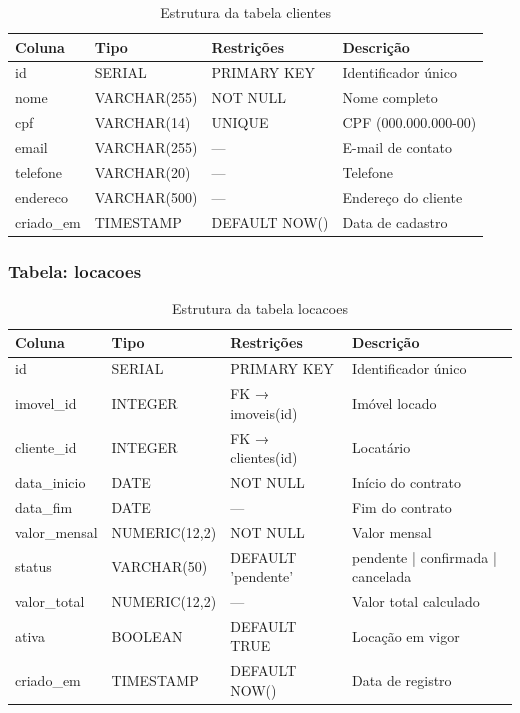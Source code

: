 \documentclass[12pt, a4paper]{article}
\newcommand{\thead}[1]{\cellcolor{tableheader}\color{white}\bfseries #1}
\newcommand{\talt}{\rowcolor{tablerowalt}}
\begin{document}
\begin{table}[H]
\centering
\begin{tabularx}{\textwidth}{|l|l|l|X|}
\hline
\thead{Coluna} & \thead{Tipo} & \thead{Restrições} & \thead{Descrição} \\
\hline
id         & SERIAL       & PRIMARY KEY   & Identificador único \\
\talt nome      & VARCHAR(255) & NOT NULL      & Nome completo \\
cpf        & VARCHAR(14)  & UNIQUE        & CPF (000.000.000-00) \\
\talt email     & VARCHAR(255) & —             & E-mail de contato \\
telefone   & VARCHAR(20)  & —             & Telefone \\
\talt endereco  & VARCHAR(500) & —             & Endereço do cliente \\
criado\_em & TIMESTAMP    & DEFAULT NOW() & Data de cadastro \\
\hline
\end{tabularx}
\caption{Estrutura da tabela clientes}
\end{table}

\subsubsection{Tabela: locacoes}

\begin{table}[H]
\centering
\begin{tabularx}{\textwidth}{|l|l|l|X|}
\hline
\thead{Coluna} & \thead{Tipo} & \thead{Restrições} & \thead{Descrição} \\
\hline
id           & SERIAL        & PRIMARY KEY        & Identificador único \\
\talt imovel\_id  & INTEGER       & FK → imoveis(id)   & Imóvel locado \\
cliente\_id  & INTEGER       & FK → clientes(id)  & Locatário \\
\talt data\_inicio & DATE          & NOT NULL           & Início do contrato \\
data\_fim    & DATE          & —                  & Fim do contrato \\
\talt valor\_mensal& NUMERIC(12,2) & NOT NULL           & Valor mensal \\
status       & VARCHAR(50)   & DEFAULT 'pendente' & pendente | confirmada | cancelada \\
\talt valor\_total & NUMERIC(12,2) & —                  & Valor total calculado \\
ativa        & BOOLEAN       & DEFAULT TRUE       & Locação em vigor \\
\talt criado\_em   & TIMESTAMP     & DEFAULT NOW()      & Data de registro \\
\hline
\end{tabularx}
\caption{Estrutura da tabela locacoes}
\end{table}
\end{document}
